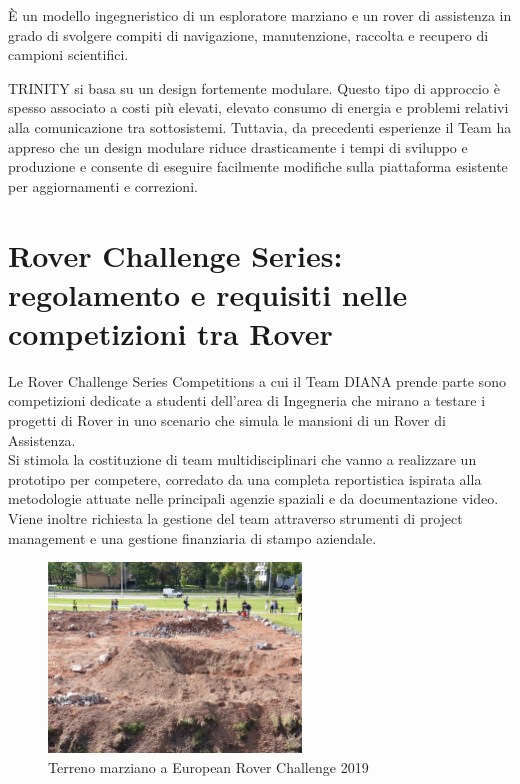 \documentclass[%
corpo=11pt,
twoside,
 stile=classica,
oldstyle,
greek,%
]{toptesi}
\begin{document}
	È un modello ingegneristico di un esploratore marziano e un rover di assistenza in grado di svolgere compiti di navigazione, manutenzione, raccolta e recupero di campioni scientifici.
	
	TRINITY si basa su un design fortemente modulare. Questo tipo di approccio è spesso associato a costi più elevati, elevato consumo di energia e problemi relativi alla comunicazione tra sottosistemi. Tuttavia, da precedenti esperienze il Team ha appreso che un design modulare riduce drasticamente i tempi di sviluppo e produzione e consente di eseguire facilmente modifiche sulla piattaforma esistente per aggiornamenti e correzioni.
	
	
	 
		
	\section{Rover Challenge Series: regolamento e requisiti nelle competizioni tra Rover}
	Le Rover Challenge Series Competitions a cui il Team DIANA prende parte sono competizioni dedicate a studenti dell'area di Ingegneria che mirano a testare i progetti di Rover in uno scenario che simula le mansioni di un Rover di Assistenza.\\
	Si stimola la costituzione di team multidisciplinari che vanno a realizzare un prototipo per competere, corredato da una completa reportistica ispirata alla metodologie attuate nelle principali agenzie spaziali e da documentazione video.\\
	 Viene inoltre richiesta la gestione del team attraverso strumenti di project management e una gestione finanziaria di stampo aziendale.
 
	\begin{figure}
		\centering
		\includegraphics[width=0.6\textwidth]{image/terrain.jpeg}
		\caption{Terreno marziano a European Rover Challenge 2019}
		\label{fig:ercterrain}
	\end{figure}
\end{document}
